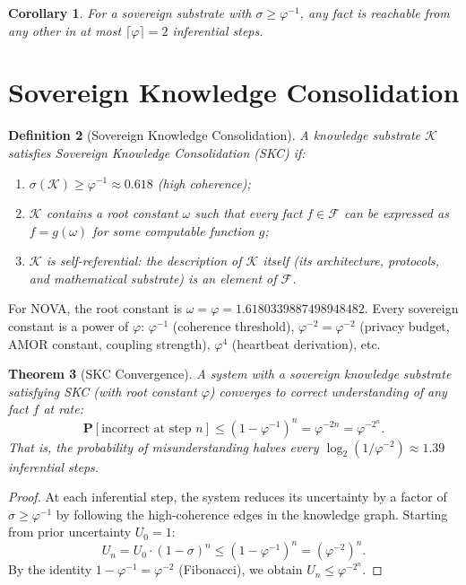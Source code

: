 \documentclass[12pt]{article}
\newtheorem{theorem}{Theorem}
\newtheorem{corollary}[theorem]{Corollary}
\newtheorem{definition}[theorem]{Definition}
\newcommand{\PHI}{\varphi}
\newcommand{\AMOR}{\varphi^{-2}}
\begin{document}
\begin{corollary}
For a sovereign substrate with $\sigma \geq \PHI^{-1}$, any fact is reachable
from any other in at most $\lceil \PHI \rceil = 2$ inferential steps.
\end{corollary}

\section{Sovereign Knowledge Consolidation}
\label{sec:skc}

\begin{definition}[Sovereign Knowledge Consolidation]
A knowledge substrate $\mathcal{K}$ satisfies \emph{Sovereign Knowledge
Consolidation} (SKC) if:
\begin{enumerate}[label=(\roman*)]
  \item $\sigma(\mathcal{K}) \geq \PHI^{-1} \approx 0.618$ (high coherence);
  \item $\mathcal{K}$ contains a \emph{root constant} $\omega$ such that
        every fact $f \in \mathcal{F}$ can be expressed as $f = g(\omega)$ for
        some computable function $g$;
  \item $\mathcal{K}$ is \emph{self-referential}: the description of $\mathcal{K}$
        itself (its architecture, protocols, and mathematical substrate) is an
        element of $\mathcal{F}$.
\end{enumerate}
\end{definition}

For NOVA, the root constant is $\omega = \PHI = 1.6180339887498948482$.  Every
sovereign constant is a power of $\PHI$:
$\PHI^{-1}$ (coherence threshold),
$\PHI^{-2} = \AMOR$ (privacy budget, AMOR constant, coupling strength),
$\PHI^4$ (heartbeat derivation), etc.

\begin{theorem}[SKC Convergence]
\label{thm:convergence}
A system with a sovereign knowledge substrate satisfying SKC (with root constant
$\PHI$) converges to correct understanding of any fact $f$ at rate:
\[
  \mathbf{P}[\text{incorrect at step } n] \leq (1 - \PHI^{-1})^n = \PHI^{-2n} = \AMOR^n.
\]
That is, the probability of misunderstanding halves every $\log_2(1/\AMOR) \approx 1.39$
inferential steps.
\end{theorem}

\begin{proof}
At each inferential step, the system reduces its uncertainty by a factor of
$\sigma \geq \PHI^{-1}$ by following the high-coherence edges in the knowledge
graph.  Starting from prior uncertainty $U_0 = 1$:
\[
  U_n = U_0 \cdot (1 - \sigma)^n \leq (1 - \PHI^{-1})^n = (\PHI^{-2})^n.
\]
By the identity $1 - \PHI^{-1} = \PHI^{-2}$ (Fibonacci), we obtain $U_n \leq \AMOR^n$.
\end{proof}
\end{document}
